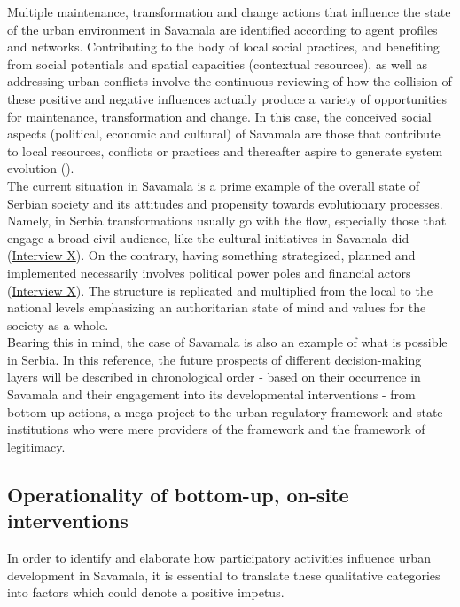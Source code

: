 \documentclass[11pt]{report}
\begin{document}
{{{Multiple maintenance, transformation and change actions that influence the state of the urban environment in Savamala are identified according to agent profiles and networks.
Contributing to the body of local social practices, and benefiting from social potentials and spatial capacities (contextual resources), as well as addressing urban conflicts involve the continuous reviewing of how the collision of these positive and negative influences actually produce a variety of opportunities for maintenance, transformation and change.
In this case, the conceived social aspects (political, economic and cultural) of Savamala are those that contribute to local resources, conflicts or practices and thereafter aspire to generate system evolution (\href{Cvetinovic}{\citealt{cvetinovic_engine_2013}}). 
\\

The current situation in Savamala is a prime example of the overall state of Serbian society and its attitudes and propensity towards evolutionary processes.
Namely, in Serbia transformations usually go with the flow, especially those that engage a broad civil audience, like the cultural initiatives in Savamala did
(\href{InterviewX}{Interview X}).
On the contrary, having something strategized, planned and implemented necessarily involves political power poles and financial actors (\href{InterviewX}{Interview X}).
The structure is replicated and multiplied from the local to the national levels emphasizing an authoritarian state of mind and values for the society as a whole.
\\

Bearing this in mind, the case of Savamala is also an example of what is possible in Serbia. In this reference, the future prospects of different decision-making layers will be described in chronological order - based on their occurrence in Savamala and their engagement into its developmental interventions - from bottom-up actions, a mega-project to the urban regulatory framework and state institutions who were mere providers of the framework and the framework of legitimacy.

\subsection{Operationality of bottom-up, on-site interventions}

In order to identify and elaborate how participatory activities influence urban development in Savamala, it is essential to translate these qualitative categories into factors which could denote a positive impetus.
\\

}}}
\end{document}
